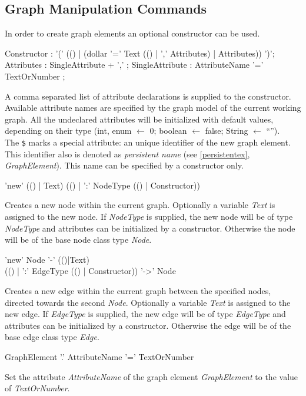 \documentclass[a4paper,11pt]{report}
\begin{document}
\subsection{Graph Manipulation Commands}
\label{mani}
In order to create graph elements an optional constructor can be used. 
\begin{rail}
  Constructor : '(' (() | (dollar '=' Text (() | ',' Attributes) | Attributes)) ')';
  Attributes : SingleAttribute + ',' ;
  SingleAttribute : AttributeName '=' TextOrNumber ; 
\end{rail}
A comma separated list of attribute declarations is supplied to the constructor. Available attribute names are specified by the graph model of the current working graph. All the undeclared attributes will be initialized with default values, depending on their type (int, enum $\leftarrow$ 0; boolean $\leftarrow$ false; String $\leftarrow$ ``'').\\
The \texttt{\$} marks a special attribute: an unique identifier of the new graph element. This identifier also is denoted as \emph{persistent name} (see \ref{persistentex}, \emph{GraphElement}). This name can be specified by a constructor only.

\begin{rail}
  'new' (() | Text) (() | ':' NodeType (() | Constructor))
\end{rail}
Creates a new node within the current graph. Optionally a variable \emph{Text} is assigned to the new node. If \emph{NodeType} is supplied, the new node will be of type \emph{NodeType} and attributes can be initialized by a constructor. Otherwise the node will be of the base node class type \emph{Node}.

\begin{rail}
  'new' Node '-' (()|Text) \\ (() | ':' EdgeType (() | Constructor)) '->' Node
\end{rail}
Creates a new edge within the current graph between the specified nodes, directed towards the second \emph{Node}. Optionally  a variable \emph{Text} is assigned to the new edge. If \emph{EdgeType} is supplied, the new edge will be of type \emph{EdgeType} and attributes can be initialized by a constructor. Otherwise the edge will be of the base edge class type \emph{Edge}.

\begin{rail}
  GraphElement '.' AttributeName '=' TextOrNumber
\end{rail}
Set the attribute \emph{AttributeName} of the graph element \emph{GraphElement} to the value of \emph{TextOrNumber}.
\end{document}
